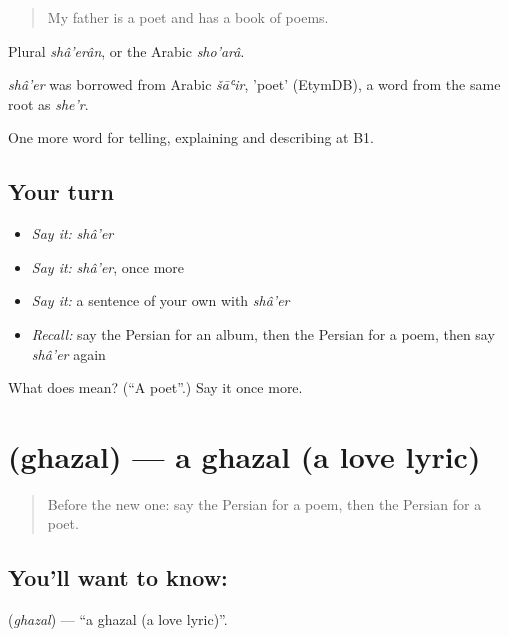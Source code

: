 \begin{quote}
My father is a poet and has a book of poems.
\end{quote}

Plural \emph{shâ'erân}, or the Arabic \emph{sho'arâ}.

\begin{cousinweb}
\emph{shâ'er} was borrowed from Arabic \emph{šāʿir}, 'poet' (EtymDB), a word from the same root as \emph{she'r}.
\end{cousinweb}

\begin{grammarlens}[title={What you've built}]
One more word for telling, explaining and describing at B1.
\end{grammarlens}

\subsection*{Your turn}
\begin{itemize}
\raggedright
  \item \emph{Say it:} \emph{shâ'er}
  \item \emph{Say it:} \emph{shâ'er}, once more
  \item \emph{Say it:} a sentence of your own with \emph{shâ'er}
  \item \emph{Recall:} say the Persian for an album, then the Persian for a poem, then say \emph{shâ'er} again
\end{itemize}

\begin{tcolorbox}[breakable,colback=teal!4,colframe=teal!35!black,title={Before you move on}]
What does  mean? (\textquotedblleft{}A poet\textquotedblright{}.) Say it once more.
\end{tcolorbox}
\section[\texorpdfstring{\fa{غزل} (ghazal)}{غزل (ghazal)}]{ (ghazal) — a ghazal (a love lyric)}

\label{lesson:FA-C521-ghazal}



\begin{quote}
Before the new one: say the Persian for a poem, then the Persian for a poet.
\end{quote}

\subsection*{You'll want to know: }
\textbf{} (\emph{ghazal}) — \textquotedblleft{}a ghazal (a love lyric)\textquotedblright{}.

